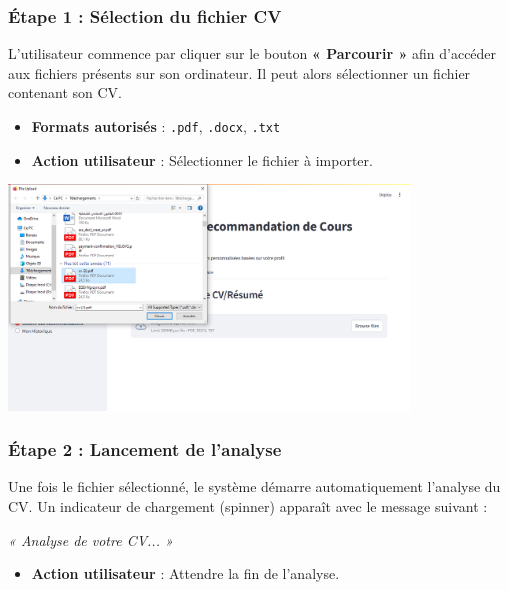 \subsubsection*{Étape 1 : Sélection du fichier CV}

L'utilisateur commence par cliquer sur le bouton \textbf{« Parcourir »} afin d’accéder aux fichiers présents sur son ordinateur. Il peut alors sélectionner un fichier contenant son CV.

\begin{itemize}
  \item \textbf{Formats autorisés} : \texttt{.pdf}, \texttt{.docx}, \texttt{.txt}
  \item \textbf{Action utilisateur} : Sélectionner le fichier à importer.
\end{itemize}

\begin{center}
\includegraphics[width=0.8\textwidth]{images/img1.png}
\end{center}

\vspace{0.3cm}

\subsubsection*{Étape 2 : Lancement de l’analyse}

Une fois le fichier sélectionné, le système démarre automatiquement l’analyse du CV. Un indicateur de chargement (spinner) apparaît avec le message suivant :

\begin{center}
\textit{« Analyse de votre CV... »}
\end{center}

\begin{itemize}
  \item \textbf{Action utilisateur} : Attendre la fin de l’analyse.
\end{itemize}

